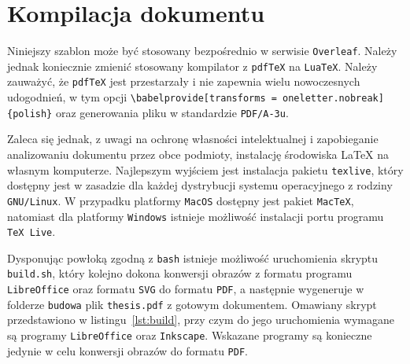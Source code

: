 \chapter{Kompilacja dokumentu}

Niniejszy szablon może być stosowany bezpośrednio w serwisie \texttt{Overleaf}. Należy jednak koniecznie zmienić stosowany kompilator z \texttt{pdfTeX} na \texttt{LuaTeX}. Należy zauważyć, że \texttt{pdfTeX} jest przestarzały i nie zapewnia wielu nowoczesnych udogodnień, w tym opcji \verb|\babelprovide[transforms = oneletter.nobreak]{polish}| oraz generowania pliku w standardzie \texttt{PDF/A-3u}.

Zaleca się jednak, z uwagi na ochronę własności intelektualnej i zapobieganie analizowaniu dokumentu przez obce podmioty, instalację środowiska \LaTeX{} na własnym komputerze. Najlepszym wyjściem jest instalacja pakietu \texttt{texlive}, który dostępny jest w zasadzie dla każdej dystrybucji systemu operacyjnego z rodziny \texttt{GNU/Linux}. W przypadku platformy \texttt{MacOS} dostępny jest pakiet \texttt{MacTeX}, natomiast dla platformy \texttt{Windows} istnieje możliwość instalacji portu programu \texttt{TeX Live}.

Dysponując powłoką zgodną z \texttt{bash} istnieje możliwość uruchomienia skryptu \texttt{build.sh}, który kolejno dokona konwersji obrazów z formatu programu \texttt{LibreOffice} oraz formatu \texttt{SVG} do formatu \texttt{PDF}, a następnie wygeneruje w folderze \texttt{budowa} plik \texttt{thesis.pdf} z gotowym dokumentem. Omawiany skrypt przedstawiono w listingu~\ref{lst:build}, przy czym do jego uruchomienia wymagane są programy \texttt{LibreOffice} oraz \texttt{Inkscape}. Wskazane programy są konieczne jedynie w celu konwersji obrazów do formatu \texttt{PDF}.

\begin{listing}[hbt!]
\inputminted[linenos, breaklines]{bash}{build.sh}
\end{listing}
